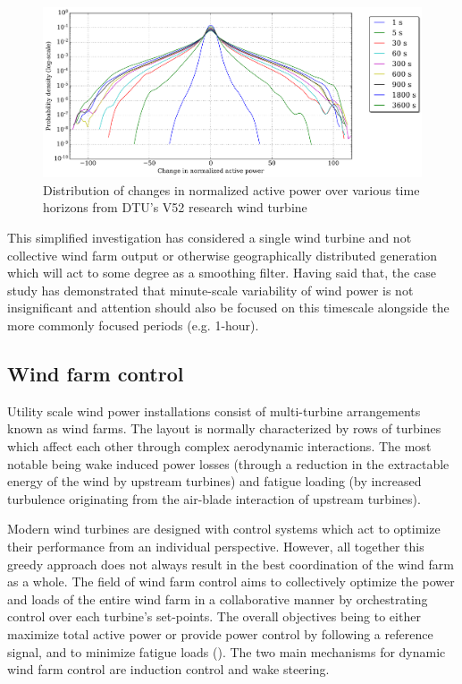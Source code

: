 \begin{figure}[htbp]
    \centering
        \includegraphics[width=1.0\textwidth]{graphics/intro/variability/norm_act_pow_error_dist.png}
    \caption{Distribution of changes in normalized active power over various time horizons from DTU's V52 research wind turbine}
    \label{fig:norm_act_pow_error_dist}
\end{figure}

This simplified investigation has considered a single wind turbine and not collective wind farm output or otherwise geographically distributed generation which will act to some degree as a smoothing filter. Having said that, the case study has demonstrated that minute-scale variability of wind power is not insignificant and attention should also be focused on this timescale alongside the more commonly focused periods (e.g. 1-hour).

\clearpage
\subsection{Wind farm control}
\label{sec:intro_control}

Utility scale wind power installations consist of multi-turbine arrangements known as wind farms. The layout is normally characterized by rows of turbines which affect each other through complex aerodynamic interactions. The most notable being wake induced power losses (through a reduction in the extractable energy of the wind by upstream turbines) and fatigue loading (by increased turbulence originating from the air-blade interaction of upstream turbines).

Modern wind turbines are designed with control systems which act to optimize their performance from an individual perspective. However, all together this greedy approach does not always result in the best coordination of the wind farm as a whole. The field of wind farm control aims to collectively optimize the power and loads of the entire wind farm in a collaborative manner by orchestrating control over each turbine's set-points. The overall objectives being to either maximize total active power or provide power control by following a reference signal, and to minimize fatigue loads (\cite{knudsen_survey_2015}). The two main mechanisms for dynamic wind farm control are induction control and wake steering.

